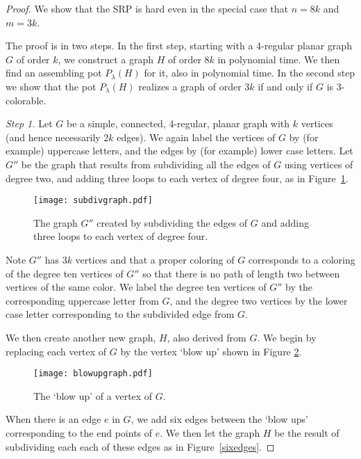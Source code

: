 \documentclass{elsarticle}
\theoremstyle{definition}
\theoremstyle{remark}
\theoremstyle{plain}
\theoremstyle{plain}
\begin{document}
\begin{proof}
We show that the SRP is hard even in the special case that $n=8k$ and $m=3k$. 

The proof is in two steps.  In the first step, starting with a 4-regular planar graph $G$ of order $k$, we construct a  graph $H$ of order $8k$ in polynomial time.  We then find an assembling pot $P_{\lambda}(H)$ for it, also in polynomial time.    In the second step we show that the pot $P_{\lambda}(H)$ realizes a graph of order $3k$ if and only if $G$ is 3-colorable. 

\emph{Step 1.}  Let $G$ be a simple, connected, 4-regular, planar graph with $k$ vertices (and hence necessarily $2k$ edges).  We again label the vertices of $G$ by (for example) uppercase letters, and the edges by (for example) lower case letters.  Let $G''$ be the graph that results from subdividing all the edges of $G$ using vertices of degree two, and adding three loops to each vertex of degree four, as in Figure~\ref{looped}.

\begin{figure}
  \centering   
  \texttt{[image: subdivgraph.pdf]}
  \caption{The graph $G''$ created by subdividing the edges of $G$ and adding three loops to each vertex of degree four.}
  \label{looped}
  \end{figure} 
  
Note $G''$ has $3k$ vertices and that a proper coloring of $G$ corresponds to a coloring of the degree ten vertices of $G''$ so that there is no path of length two between vertices of the same color.  We label the degree ten vertices of $G''$ by the corresponding uppercase letter from $G$, and the degree two vertices by the lower case letter corresponding to the subdivided edge from $G$. 

 We then create another new graph, $H$, also derived from $G$.  We begin by replacing each vertex of $G$ by the vertex `blow up' shown in Figure \ref{blowup}.  
 
 \begin{figure}
  \centering   
  \texttt{[image: blowupgraph.pdf]}
  \caption{The `blow up' of a vertex of $G$.}
  \label{blowup}
  \end{figure} 
  
 
 
 When there is an edge $e$ in $G$, we add six edges between the `blow ups' corresponding to the end points of $e$.  We then let the graph $H$ be the result of subdividing each each of these edges as in Figure~\ref{sixedges}. 
 

\end{proof}
\end{document}
